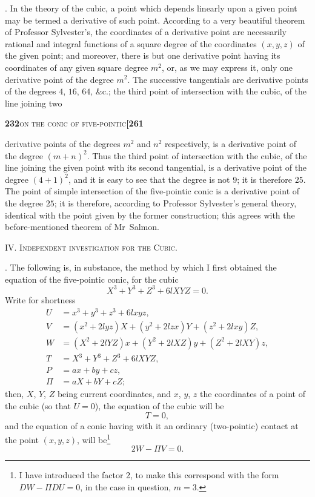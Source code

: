 \documentclass[11pt]{article}
\begin{document}
\medskip

. In the theory of the cubic, a point which depends linearly upon a given point may be termed a derivative of such point. According to a very beautiful theorem of Professor Sylvester's, the coordinates of a derivative point are necessarily rational and integral functions of a square degree of the coordinates $(x, y, z)$ of the given point; and moreover, there is but one derivative point having its coordinates of any given square degree $m^2$, or, as we may express it, only one derivative point of the degree $m^2$. The successive tangentials are derivative points of the degrees $4$, $16$, $64$, \&c.; the third point of intersection with the cubic, of the line joining two

\newpage
\noindent\textbf{232}\hfill\textsc{on the conic of five-pointic}\hfill\textbf{[261}

\medskip

\noindent derivative points of the degrees $m^2$ and $n^2$ respectively, is a derivative point of the degree $(m + n)^2$. Thus the third point of intersection with the cubic, of the line joining the given point with its second tangential, is a derivative point of the degree $(4 + 1)^2$, and it is easy to see that the degree is not $9$; it is therefore $25$. The point of simple intersection of the five-pointic conic is a derivative point of the degree $25$; it is therefore, according to Professor Sylvester's general theory, identical with the point given by the former construction; this agrees with the before-mentioned theorem of Mr~Salmon.

\bigskip

\begin{center}
\textsc{IV. Independent investigation for the Cubic.}
\end{center}

\medskip

. The following is, in substance, the method by which I first obtained the equation of the five-pointic conic, for the cubic
\[
  X^3 + Y^3 + Z^3 + 6lXYZ = 0.
\]
Write for shortness
\[
\begin{aligned}
  U &= x^3 + y^3 + z^3 + 6lxyz,\\
  V &= (x^2 + 2lyz) X + (y^2 + 2lzx) Y + (z^2 + 2lxy) Z,\\
  W &= (X^2 + 2lYZ) x + (Y^2 + 2lXZ) y + (Z^2 + 2lXY) z,\\
  T &= X^3 + Y^3 + Z^3 + 6lXYZ,\\
  P &= ax + by + cz,\\
  \Pi &= aX + bY + cZ;
\end{aligned}
\]
then, $X$, $Y$, $Z$ being current coordinates, and $x$, $y$, $z$ the coordinates of a point of the cubic (so that $U = 0$), the equation of the cubic will be
\[
  T = 0,
\]
and the equation of a conic having with it an ordinary (two-pointic) contact at the point $(x, y, z)$, will be\footnote{I have introduced the factor 2, to make this correspond with the form $DW - \Pi DU = 0$, in the case in question, $m = 3$.}
\[
  2W - \Pi V = 0.
\]
\end{document}
